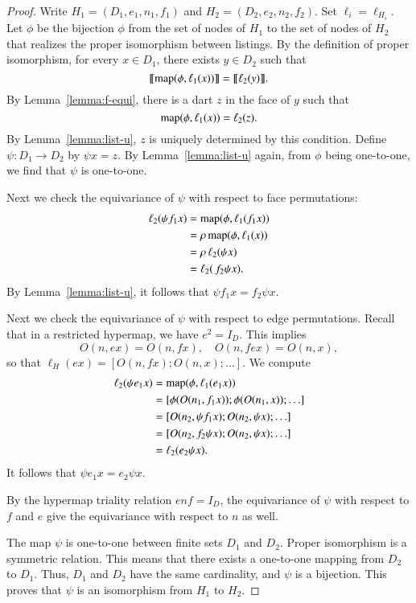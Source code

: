 \begin{proof} 
  Write $H_1 =(D_1,e_1,n_1,f_1)$ and $H_2=(D_2,e_2,n_2,f_2)$.  Set
  $\ell_i = \ell_{H_i}$.  Let $\phi$ be the  bijection $\phi$
  from the set of nodes of $H_1$ to the set of nodes of $H_2$ that
  realizes the proper isomorphism between listings.  By the definition
  of proper isomorphism, for every $x\in D_1$, there exists $y\in D_2$
  such that
\[
{\llbracket{{\operatorname{map}}(\phi,\ell_{1}(x))}\rrbracket} = {\llbracket{\ell_{2}(y)}\rrbracket}.
\]
By Lemma~\ref{lemma:f-equi}, there is a dart $z$ in the face of $y$ such that
\[
{\operatorname{map}}(\phi,\ell_{1}(x)) = \ell_{2}(z).
\]
By Lemma~\ref{lemma:list-u}, $z$ is uniquely determined by this
condition.  Define $\psi:D_1\to D_2$ by $\psi x = z$.  By
Lemma~\ref{lemma:list-u} again, from $\phi$ being one-to-one, we find
that $\psi$ is one-to-one.

Next we check the equivariance of $\psi$ with respect to face permutations:
\begin{align*}
\ell_{2}(\psi f_1 x) &= {\operatorname{map}}(\phi,\ell_{1}(f_1 x)) \\
   &= \rho\, {\operatorname{map}}(\phi,\ell_{1} (x)) \\
   &= \rho\, \ell_{2}(\psi x)\\
   &= \ell_2(\,f_2 \psi x).
\end{align*}
By Lemma~\ref{lemma:list-u}, it follows that $\psi f_1 x = f_2 \psi x$.

Next we check the equivariance of $\psi$ with respect to edge
permutations.  Recall that in a restricted hypermap, we have
$e^2=I_D$.  This implies
\[
O(n,e x) =  O(n,f x),\quad
O(n,f e x) = O(n,x),
\]
so that $\ell_H(e x) = [O(n,f x);O(n,x);\ldots]$.  We compute
\begin{align*}
\ell_2(\psi e_1 x) &= {\operatorname{map}}(\phi,\ell_1(e_1 x)) \\
  &= [\phi(O(n_1,f_1 x));\phi(O(n_1,x));\ldots]\\
  &= [O(n_2,\psi f_1 x);O(n_2,\psi x);\ldots]\\
  &= [O(n_2,f_2\psi x);O(n_2,\psi x);\ldots]\\
   &=\ell_2(e_2 \psi x).
\end{align*}
It follows that $\psi e_1 x = e_2 \psi x$.

By the hypermap triality relation $e n f = I_D$, the equivariance of
$\psi$ with respect to $f$ and $e$ give the equivariance with respect
to $n$ as well.

The map $\psi$ is one-to-one between finite sets $D_1$ and $D_2$.
Proper isomorphism is a symmetric relation.  This means that there
exists a one-to-one mapping from $D_2$ to $D_1$.  Thus, $D_1$ and
$D_2$ have the same cardinality, and $\psi$ is a bijection.  This
proves that $\psi$ is an isomorphism from $H_1$ to $H_2$.
\end{proof}

